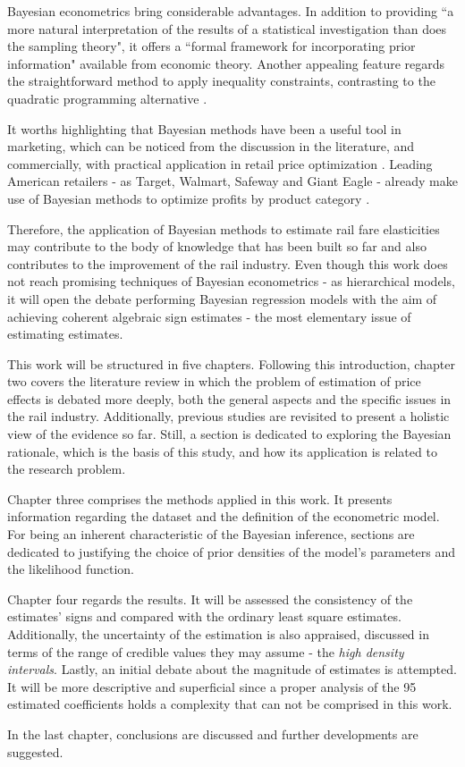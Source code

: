 Bayesian econometrics bring considerable advantages. In addition to providing ``a more natural interpretation of the results of a statistical investigation than does the sampling theory", it offers a ``formal framework for incorporating prior information" \citep[p.~36]{griffiths1988} available from economic theory. Another appealing feature regards the straightforward method to apply inequality constraints, contrasting to the quadratic programming alternative \citep{geweke1986}. 

It worths highlighting that Bayesian methods have been a useful tool in marketing, which can be noticed from the discussion in the literature, and commercially, with practical application in retail price optimization \citep{liu2009}. Leading American retailers - as Target, Walmart, Safeway and Giant Eagle - already make use of Bayesian methods to optimize profits by product category \citep{liu2009}.

Therefore, the application of Bayesian methods to estimate rail fare elasticities may contribute to the body of knowledge that has been built so far and also contributes to the improvement of the rail industry. Even though this work does not reach promising techniques of Bayesian econometrics - as hierarchical models, it will open the debate performing Bayesian regression models with the aim of achieving coherent algebraic sign estimates - the most elementary issue of estimating estimates.

This work will be structured in five chapters. Following this introduction, chapter two covers the literature review in which the problem of estimation of price effects is debated more deeply, both the general aspects and the specific issues in the rail industry. Additionally, previous studies are revisited to present a holistic view of the evidence so far. Still, a section is dedicated to exploring the Bayesian rationale, which is the basis of this study, and how its application is related to the research problem. 

Chapter three comprises the methods applied in this work. It presents information regarding the dataset and the definition of the econometric model. For being an inherent characteristic of the Bayesian inference, sections are dedicated to justifying the choice of prior densities of the model's parameters and the likelihood function. 

Chapter four regards the results. It will be assessed the consistency of the estimates' signs and compared with the ordinary least square estimates. Additionally, the uncertainty of the estimation is also appraised, discussed in terms of the range of credible values they may assume - the \textit{high density intervals}. Lastly, an initial debate about the magnitude of estimates is attempted. It will be more descriptive and superficial since a proper analysis of the 95 estimated coefficients holds a complexity that can not be comprised in this work.

In the last chapter, conclusions are discussed and further developments are suggested. 
